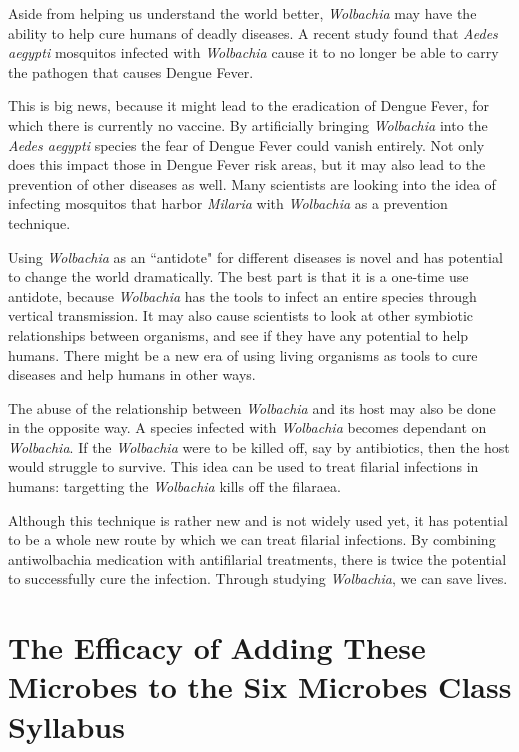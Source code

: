 \documentclass[twocolumn]{article}
\begin{document}
Aside from helping us understand the world better, \textit{Wolbachia} may have the ability to help cure humans of deadly diseases. A recent study found that \textit{Aedes aegypti} mosquitos infected with \textit{Wolbachia} cause it to no longer be able to carry the pathogen that causes Dengue Fever.\cite{Wdengue_fever}

This is big news, because it might lead to the eradication of Dengue Fever, for which there is currently no vaccine. By artificially bringing \textit{Wolbachia} into the \textit{Aedes aegypti} species the fear of Dengue Fever could vanish entirely. Not only does this impact those in Dengue Fever risk areas, but it may also lead to the prevention of other diseases as well. Many scientists are looking into the idea of infecting mosquitos that harbor \textit{Milaria} with \textit{Wolbachia} as a prevention technique.\cite{Wmilaria}

Using \textit{Wolbachia} as an ``antidote" for different diseases is novel and has potential to change the world dramatically. The best part is that it is a one-time use antidote, because \textit{Wolbachia} has the tools to infect an entire species through vertical transmission. It may also cause scientists to look at other symbiotic relationships between organisms, and see if they have any potential to help humans. There might be a new era of using living organisms as tools to cure diseases and help humans in other ways.

The abuse of the relationship between \textit{Wolbachia} and its host may also be done in the opposite way. A species infected with \textit{Wolbachia} becomes dependant on \textit{Wolbachia}. If the \textit{Wolbachia} were to be killed off, say by antibiotics, then the host would struggle to survive. This idea can be used to treat filarial infections in humans: targetting the \textit{Wolbachia} kills off the filaraea.\cite{wolbachia}\cite{Wcure_filarial_infection}

Although this technique is rather new and is not widely used yet, it has potential to be a whole new route by which we can treat filarial infections. By combining antiwolbachia medication with antifilarial treatments, there is twice the potential to successfully cure the infection. Through studying \textit{Wolbachia}, we can save lives.


\section*{The Efficacy of Adding These Microbes to the Six Microbes Class Syllabus}
\end{document}
